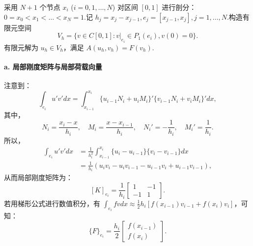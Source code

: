采用 $N+1$ 个节点 $x_i$ ($i=0,1,\dots,N$) 对区间 $[0,1]$ 进行剖分：$0 = x_0 < x_1 < \dots < x_N = 1$.记 $h_j = x_j - x_{j-1}, e_j = [x_{j-1}, x_j], j=1,\dots,N$.构造有限元空间
\begin{equation*}
V_h = \{v \in C[0,1] : v|_{e_i} \in P_1(e_i), v(0) = 0\}.
\end{equation*}
有限元解为 $u_h \in V_h$，满足 $A(u_h, v_h) = F(v_h)$.

\paragraph{a. 局部刚度矩阵与局部荷载向量}
注意到：
\begin{equation*}
\int_{e_i} u' v' dx = \int_{x_{i-1}}^{x_i} \{u_{i-1}N_i + u_i M_i\}' \{v_{i-1}N_i + v_i M_i\}' dx,
\end{equation*}
其中，
\begin{equation*}
N_i = \frac{x_i - x}{h_i}, \quad M_i = \frac{x - x_{i-1}}{h_i}, \quad N_i' = -\frac{1}{h_i}, \quad M_i' = \frac{1}{h_i}.
\end{equation*}
所以，
\begin{align*}
\int_{e_i} u' v' dx &= \frac{1}{h_i^2} \int_{x_{i-1}}^{x_i} \{u_i - u_{i-1}\} \{v_i - v_{i-1}\} dx \\
&= \frac{1}{h_i} (u_i v_i - u_i v_{i-1} - u_{i-1} v_i + u_{i-1} v_{i-1}),
\end{align*}
从而局部刚度矩阵为：
\begin{equation}\label{eq:local_K}
[K]_{e_i} = \frac{1}{h_i} \begin{bmatrix} 1 & -1 \\ -1 & 1 \end{bmatrix}.
\end{equation}
若用梯形公式进行数值积分，有 $\int_{e_i} f v dx \approx \frac{1}{2} h_i [f(x_{i-1})v_{i-1} + f(x_i)v_i]$，可知：
\begin{equation}
\{F\}_{e_i} = \frac{h_i}{2} \begin{bmatrix} f(x_{i-1}) \\ f(x_i) \end{bmatrix}.
\end{equation}

